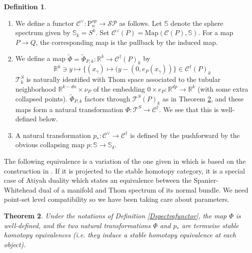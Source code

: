 \documentclass[reqno]{amsart}
\theoremstyle{definition}
\newtheorem{defi}{Definition}[section]
\theoremstyle{plain}
\newtheorem{thm}[defi]{Theorem}
\newcommand{\TT}{\mathcal{T}} %
\newcommand{\TPhi}{\widetilde{\Phi}}
\newcommand{\Map}{\mathrm{Map}}
\newcommand{\SP}{\mathcal{SP}}
\newcommand{\RR}{\mathbb{R}}
\newcommand{\Sphere}{\mathbb{S}}
\newcommand{\PP}{\mathrm{P}} %
\begin{document}
\begin{defi}
\begin{enumerate}
\item We define a functor $\mathcal{C}^\vee:\PP_n^{op}\to \SP$ as follows. Let $\Sphere$ denote the sphere spectrum given by $\Sphere_k=S^k$.
Set $\mathcal{C}^{\vee}(P)=\Map(\mathcal{C}(P),\Sphere)$.   For a map $P\to Q$, the corresponding map is the pullback by the induced map.
\item We define a map $\TPhi= \TPhi_{P,k}:\RR^k\to \mathcal{C}^\dagger (P)_k$ by
\[
\RR^k\ni y\longmapsto \{(x_\gamma) \mapsto (y-(0,e_P(x_\gamma))\}\in\mathcal{C}^\dagger(P)_k
\]
$\TT^S_k$ is naturally identified with Thom space associated to the  tubular neighborhood  $\RR^{k-dn}\times \nu_P$ of the embedding $0\times e_P:\RR^{dp}\to \RR^k$ (with some extra collapsed points). $\TPhi_{P,k}$ factors through $\TT^S(P)_k$ as in Theorem  \ref{TAtiyahdual}, and  these maps form a natural transformation $\Phi : \TT^S\to \mathcal{C}^\dagger$. We see that this is well-defined below.
\item A natural transformation $p_* :\mathcal{C}^\vee\to \mathcal{C}^\dagger$ is defined by the pushforward by the obvious collapsing map $p :\Sphere\to \Sphere_{\delta}$. 
\end{enumerate}
\end{defi}
The following equivalence is a variation of the one given in \cite{moriya1} which is based on the construction in \cite{cohen}. If it is projected to the stable homotopy category, it is a special case of Atiyah duality which states an equivalence between the Spanier-Whitehead dual of a manifold and Thom spectrum of its normal bundle. We need point-set level compatibility so we have been taking care about parameters. 
\begin{thm}\label{TAtiyahdual}
Under the notations of Definition \ref{Dspectrafunctor},
the map $\Phi$ is well-defined, and the two natural transformations $\Phi$ and $p_*$ are termwise stable homotopy equivalences (i.e. they induce a stable homotopy equivalence at each object).
\end{thm}
\end{document}
